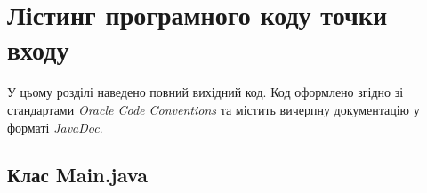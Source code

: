 \section{Лістинг програмного коду точки входу}

У цьому розділі наведено повний вихідний код. 
Код оформлено згідно зі стандартами \textit{Oracle Code Conventions} та містить 
вичерпну документацію у форматі \textit{JavaDoc}.
\subsection{Клас Main.java}
